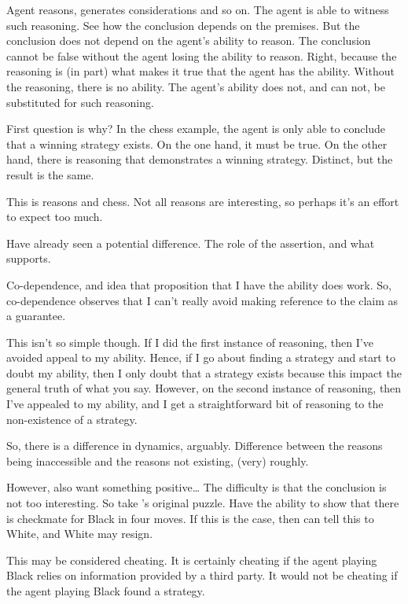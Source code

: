 \documentclass[10pt]{article}
\begin{document}
\begin{note}
Agent reasons, generates considerations and so on.
The agent is able to witness such reasoning.
See how the conclusion depends on the premises.
But the conclusion does not depend on the agent's ability to reason.
The conclusion cannot be false without the agent losing the ability to reason.
Right, because the reasoning is (in part) what makes it true that the agent has the ability.
Without the reasoning, there is no ability.
The agent's ability does not, and can not, be substituted for such reasoning.
\end{note}

\begin{note}[Why]
  First question is why?
  In the chess example, the agent is only able to conclude that a winning strategy exists.
  On the one hand, it must be true.
  On the other hand, there is reasoning that demonstrates a winning strategy.
  Distinct, but the result is the same.

  This is reasons and chess.
  Not all reasons are interesting, so perhaps it's an effort to expect too much.

  Have already seen a potential difference.
  The role of the assertion, and what supports.

  Co-dependence, and idea that proposition that I have the ability does work.
  So, co-dependence observes that I can't really avoid making reference to the claim as a guarantee.

  This isn't so simple though.
  If I did the first instance of reasoning, then I've avoided appeal to my ability.
  Hence, if I go about finding a strategy and start to doubt my ability, then I only doubt that a strategy exists because this impact the general truth of what you say.
  However, on the second instance of reasoning, then I've appealed to my ability, and I get a straightforward bit of reasoning to the non-existence of a strategy.

  So, there is a difference in dynamics, arguably.
  Difference between the reasons being inaccessible and the reasons not existing, (very) roughly.

  However, also want something positive\dots
  The difficulty is that the conclusion is not too interesting.
  So take \citeauthor{Emms:2000aa}'s original puzzle.
  Have the ability to show that there is checkmate for Black in four moves.
  If this is the case, then can tell this to White, and White may resign.

  This may be considered cheating.
  It is certainly cheating if the agent playing Black relies on information provided by a third party.
  It would not be cheating if the agent playing Black found a strategy.


\end{note}
\end{document}
